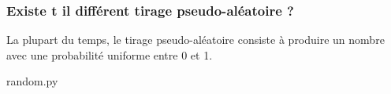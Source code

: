 \subsubsection{Existe t il différent tirage pseudo-aléatoire ? }


La plupart du temps, le tirage pseudo-aléatoire consiste à produire un nombre
avec une probabilité uniforme entre 0 et 1.





\vskip 2pt
\begin{center}
  \begin{myterminalbox}[colback=gray!10]{random.py}
\begin{verbatim}


\end{verbatim}
  \end{myterminalbox}
\end{center}
